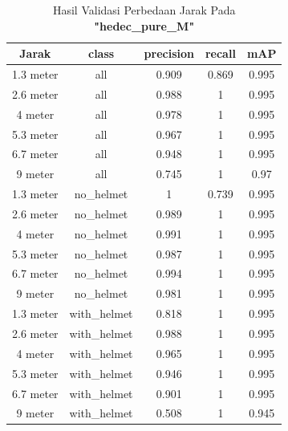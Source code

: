 \begin{enumerate}
  \begin{longtable}{|c|c|c|c|c|}
    \caption{Hasil Validasi Perbedaan Jarak Pada \textbf{"hedec\_pure\_M"}}
    \label{tb:hasiljarak_hedec_pure_M}\\
    \hline
    Jarak     & class        & precision & recall & mAP    \\
    \hline
    1.3 meter & all          & 0.909     & 0.869  & 0.995  \\
    2.6 meter & all          & 0.988     & 1      & 0.995  \\
    4 meter   & all          & 0.978     & 1      & 0.995  \\
    5.3 meter & all          & 0.967     & 1      & 0.995  \\
    6.7 meter & all          & 0.948     & 1      & 0.995  \\
    9 meter   & all          & 0.745     & 1      & 0.97   \\
    1.3 meter & no\_helmet   & 1         & 0.739  & 0.995  \\
    2.6 meter & no\_helmet   & 0.989     & 1      & 0.995  \\
    4 meter   & no\_helmet   & 0.991     & 1      & 0.995  \\
    5.3 meter & no\_helmet   & 0.987     & 1      & 0.995  \\
    6.7 meter & no\_helmet   & 0.994     & 1      & 0.995  \\
    9 meter   & no\_helmet   & 0.981     & 1      & 0.995  \\
    1.3 meter & with\_helmet & 0.818     & 1      & 0.995  \\
    2.6 meter & with\_helmet & 0.988     & 1      & 0.995  \\
    4 meter   & with\_helmet & 0.965     & 1      & 0.995  \\
    5.3 meter & with\_helmet & 0.946     & 1      & 0.995  \\
    6.7 meter & with\_helmet & 0.901     & 1      & 0.995  \\
    9 meter   & with\_helmet & 0.508     & 1      & 0.945  \\
    \hline
  \end{longtable}


\end{enumerate}
